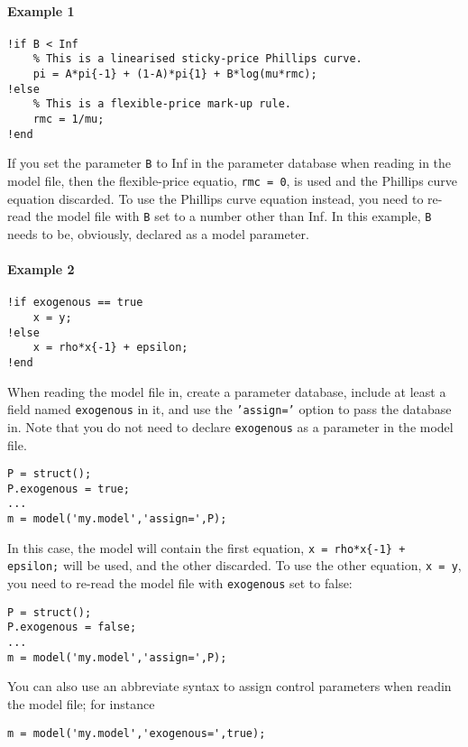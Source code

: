 \paragraph{Example 1}\label{example-1}

\begin{verbatim}
!if B < Inf
    % This is a linearised sticky-price Phillips curve.
    pi = A*pi{-1} + (1-A)*pi{1} + B*log(mu*rmc);
!else
    % This is a flexible-price mark-up rule.
    rmc = 1/mu;
!end
\end{verbatim}

If you set the parameter \texttt{B} to Inf in the parameter database
when reading in the model file, then the flexible-price equatio,
\texttt{rmc = 0}, is used and the Phillips curve equation discarded. To
use the Phillips curve equation instead, you need to re-read the model
file with \texttt{B} set to a number other than Inf. In this example,
\texttt{B} needs to be, obviously, declared as a model parameter.

\paragraph{Example 2}\label{example-2}

\begin{verbatim}
!if exogenous == true
    x = y;
!else
    x = rho*x{-1} + epsilon;
!end
\end{verbatim}

When reading the model file in, create a parameter database, include at
least a field named \texttt{exogenous} in it, and use the
\texttt{'assign='} option to pass the database in. Note that you do not
need to declare \texttt{exogenous} as a parameter in the model file.

\begin{verbatim}
P = struct();
P.exogenous = true;
...
m = model('my.model','assign=',P);
\end{verbatim}

In this case, the model will contain the first equation,
\texttt{x = rho*x\{-1\} + epsilon;} will be used, and the other
discarded. To use the other equation, \texttt{x = y}, you need to
re-read the model file with \texttt{exogenous} set to false:

\begin{verbatim}
P = struct();
P.exogenous = false;
...
m = model('my.model','assign=',P);
\end{verbatim}

You can also use an abbreviate syntax to assign control parameters when
readin the model file; for instance

\begin{verbatim}
m = model('my.model','exogenous=',true);
\end{verbatim}


